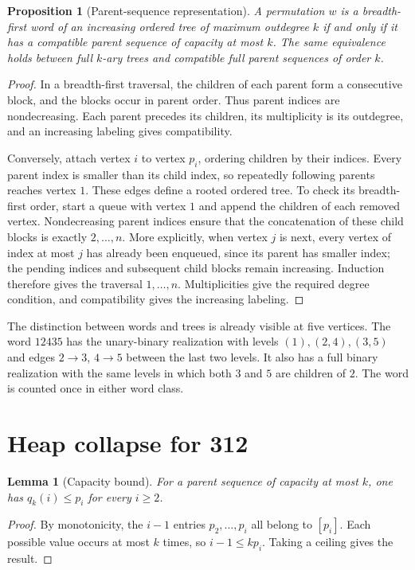 \documentclass[11pt]{article}
\newtheorem{lemma}[theorem]{Lemma}
\newtheorem{proposition}[theorem]{Proposition}
\theoremstyle{definition}
\begin{document}
\begin{proposition}[Parent-sequence representation]\label{prop:parents}
A permutation $w$ is a breadth-first word of an increasing ordered tree of maximum outdegree $k$ if and only if it has a compatible parent sequence of capacity at most $k$. The same equivalence holds between full $k$-ary trees and compatible full parent sequences of order $k$.
\end{proposition}
\begin{proof}
In a breadth-first traversal, the children of each parent form a consecutive block, and the blocks occur in parent order. Thus parent indices are nondecreasing. Each parent precedes its children, its multiplicity is its outdegree, and an increasing labeling gives compatibility.

Conversely, attach vertex $i$ to vertex $p_i$, ordering children by their indices. Every parent index is smaller than its child index, so repeatedly following parents reaches vertex $1$. These edges define a rooted ordered tree. To check its breadth-first order, start a queue with vertex $1$ and append the children of each removed vertex. Nondecreasing parent indices ensure that the concatenation of these child blocks is exactly $2,\ldots,n$. More explicitly, when vertex $j$ is next, every vertex of index at most $j$ has already been enqueued, since its parent has smaller index; the pending indices and subsequent child blocks remain increasing. Induction therefore gives the traversal $1,\ldots,n$. Multiplicities give the required degree condition, and compatibility gives the increasing labeling.
\end{proof}

The distinction between words and trees is already visible at five vertices. The word $12435$ has the unary-binary realization with levels $(1),(2,4),(3,5)$ and edges $2\to3$, $4\to5$ between the last two levels. It also has a full binary realization with the same levels in which both $3$ and $5$ are children of $2$. The word is counted once in either word class.

\section{Heap collapse for 312}\label{sec:A}

\begin{lemma}[Capacity bound]\label{lem:capacity}
For a parent sequence of capacity at most $k$, one has $q_k(i)\le p_i$ for every $i\ge2$.
\end{lemma}
\begin{proof}
By monotonicity, the $i-1$ entries $p_2,\ldots,p_i$ all belong to $[p_i]$. Each possible value occurs at most $k$ times, so $i-1\le kp_i$. Taking a ceiling gives the result.
\end{proof}
\end{document}
